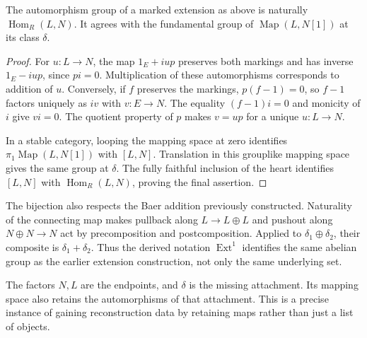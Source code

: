 \begin{proposition}
\label{t:extension-automorphisms}
The automorphism group of a marked extension as above is naturally
$\operatorname{Hom}_R(L,N)$.  It agrees with the fundamental group of
$\operatorname{Map}(L,N[1])$ at its class $\delta$.
\end{proposition}
\begin{proof}
For $u:L\to N$, the map $1_E+iup$ preserves both markings and has
inverse $1_E-iup$, since $pi=0$.  Multiplication of these automorphisms
corresponds to addition of $u$.
Conversely, if $f$ preserves the markings, $p(f-1)=0$, so $f-1$ factors
uniquely as $iv$ with $v:E\to N$.  The equality $(f-1)i=0$ and
monicity of $i$ give $vi=0$.  The quotient property of $p$ makes $v=up$
for a unique $u:L\to N$.

In a stable category, looping the mapping space at zero identifies
$\pi_1\operatorname{Map}(L,N[1])$ with $[L,N]$.  Translation in this
grouplike mapping space gives the same group at $\delta$.
The fully faithful inclusion of the heart identifies $[L,N]$ with
$\operatorname{Hom}_R(L,N)$, proving the final assertion.
\end{proof}

The bijection also respects the Baer addition previously
constructed. Naturality of the connecting map makes pullback along
$L\to L\oplus L$ and pushout along $N\oplus N\to N$ act by
precomposition and postcomposition. Applied to $\delta_1\oplus\delta_2$,
their composite is $\delta_1+\delta_2$. Thus the derived notation
$\operatorname{Ext}^1$ identifies the same abelian group as the earlier
extension construction, not only the same underlying set.

The factors $N,L$ are the endpoints, and $\delta$ is the missing
attachment.  Its mapping space also retains the automorphisms of that
attachment.  This is a precise instance of gaining reconstruction data
by retaining maps rather than just a list of objects.


